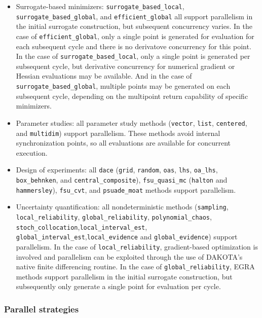 \begin{itemize}
\item Surrogate-based minimizers: \texttt{surrogate\_based\_local},
  \texttt{surrogate\_based\_global}, and \texttt{efficient\_global}
  all support parallelism in the initial surrogate construction, but
  subsequent concurrency varies.  In the case of
  \texttt{efficient\_global}, only a single point is generated for
  evaluation for each subsequent cycle and there is no derivatove
  concurrency for this point.  In the case of
  \texttt{surrogate\_based\_local}, only a single point is generated
  per subsequent cycle, but derivative concurrency for numerical
  gradient or Hessian evaluations may be available.  And in the case
  of \texttt{surrogate\_based\_global}, multiple points may be
  generated on each subsequent cycle, depending on the multipoint
  return capability of specific minimizers.

\item Parameter studies: all parameter study methods (\texttt{vector},
  \texttt{list}, \texttt{centered}, and \texttt{multidim}) support
  parallelism. These methods avoid internal synchronization points, so
  all evaluations are available for concurrent execution.

\item Design of experiments: all \texttt{dace} (\texttt{grid},
  \texttt{random}, \texttt{oas}, \texttt{lhs}, \texttt{oa\_lhs},
  \texttt{box\_behnken}, and \texttt{central\_composite}),
  \texttt{fsu\_quasi\_mc} (\texttt{halton} and \texttt{hammersley}),
  \texttt{fsu\_cvt}, and \texttt{psuade\_moat} methods support
  parallelism.

\item Uncertainty quantification: all nondeterministic methods
  (\texttt{sampling}, \texttt{local\_reliability},
  \texttt{global\_reliability}, \texttt{polynomial\_chaos},
  \texttt{stoch\_collocation},\texttt{local\_interval\_est}, 
  \texttt{global\_interval\_est},\texttt{local\_evidence} and 
  \texttt{global\_evidence})
  support parallelism. In the case of
  \texttt{local\_reliability}, gradient-based optimization is
  involved and parallelism can be exploited through the use of
  DAKOTA's native finite differencing routine.  In the case of
  \texttt{global\_reliability}, EGRA methods support parallelism
  in the initial surrogate construction, but subsequently only
  generate a single point for evaluation per cycle.
\end{itemize}

\subsubsection{Parallel strategies}\label{parallel:algorithms:strategies}

